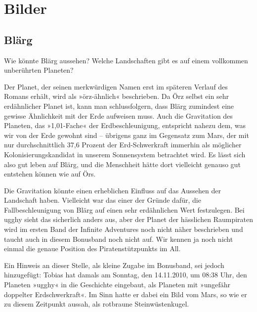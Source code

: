\part{Bilder}

\chapter{Blärg}

Wie könnte Blärg aussehen? Welche Landschaften gibt es auf einem vollkommen unberührten Planeten?

Der Planet, der seinen merkwürdigen Namen erst im späteren Verlauf des Romans erhält, wird als »örz-ähnlich« beschrieben. Da Örz selbst ein sehr erdähnlicher Planet ist, kann man schlussfolgern, dass Blärg zumindest eine gewisse Ähnlichkeit mit der Erde aufweisen muss. Auch die Gravitation des Planeten, das »1,01-Fache« der Erdbeschleunigung, entspricht nahezu dem, was wir von der Erde gewohnt sind – übrigens ganz im Gegensatz zum Mars, der mit nur durchschnittlich 37,6 Prozent der Erd-Schwerkraft immerhin als möglicher Kolonisierungskandidat in unserem Sonnensystem betrachtet wird. Es lässt sich also gut leben auf Blärg, und die Menschheit hätte dort vielleicht genauso gut entstehen können wie auf Örs.

Die Gravitation könnte einen erheblichen Einfluss auf das Aussehen der Landschaft haben. Vielleicht war das einer der Gründe dafür, die Fallbeschleunigung von Blärg auf einen sehr erdähnlichen Wert festzulegen. Bei ugghy sieht das sicherlich anders aus, aber der Planet der hässlichen Raumpiraten wird im ersten Band der Infinite Adventures noch nicht näher beschrieben und taucht auch in diesem Bonusband noch nicht auf. Wir kennen ja noch nicht einmal die genaue Position des Piratenstützpunkts im All.

Ein Hinweis an dieser Stelle, als kleine Zugabe im Bonusband, sei jedoch hinzugefügt: Tobias hat damals am Sonntag, den 14.11.2010, um 08:38 Uhr, den Planeten »ugghy« in die Geschichte eingebaut, als Planeten mit »ungefähr doppelter Erdschwerkraft«. Im Sinn hatte er dabei ein Bild vom Mars, so wie er zu diesem Zeitpunkt aussah, als rotbraune Steinwüstenkugel.



\cleardoubleoddpage

%

